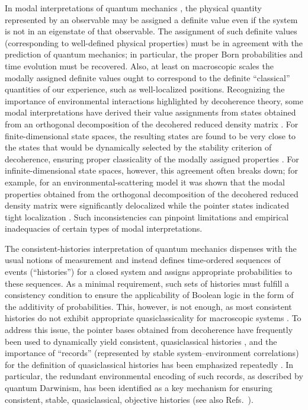 \documentclass[3p,sort&compress]{elsarticle}
\begin{document}
In modal interpretations of quantum mechanics \cite{Clifton:1996:op}, the physical quantity represented by an observable may be assigned a definite value even if the system is not in an eigenstate of that observable. The assignment of such definite values (corresponding to well-defined physical properties) must be in agreement with the prediction of quantum mechanics; in particular, the proper Born probabilities and time evolution must be recovered. Also, at least on macroscopic scales the modally assigned definite values ought to correspond to the definite ``classical'' quantities of our experience, such as well-localized positions. Recognizing the importance of environmental interactions  highlighted by decoherence theory, some modal interpretations have derived their value assignments from states obtained from an orthogonal decomposition of the decohered reduced density matrix \cite{Bacciagaluppi:1996:po,Bene:2001:po}. For finite-dimensional state spaces, the resulting states are found to be very close to the states that would be dynamically selected by the stability criterion of decoherence, ensuring proper classicality of the modally assigned properties \cite{Bacciagaluppi:1996:po,Bene:2001:po}. For infinite-dimensional state spaces, however, this agreement often breaks down; for example, for an environmental-scattering model it was shown that the modal properties obtained from the orthogonal decomposition of the decohered reduced density matrix were significantly delocalized while the pointer states indicated tight localization \cite{Bacciagaluppi:2000:yz}. Such inconsistencies can pinpoint limitations and empirical inadequacies of certain types of modal interpretations.

The consistent-histories interpretation of quantum mechanics \cite{Griffiths:1984:tr,Omnes:1994:pz,Griffiths:2002:tr} dispenses with the usual notions of measurement and instead defines time-ordered sequences of events (``histories'') for a closed system and assigns appropriate probabilities to these sequences. As a minimal requirement, such sets of histories must fulfill a consistency condition \cite{Griffiths:1984:tr,Omnes:1994:pz,Griffiths:2002:tr} to ensure the applicability of Boolean logic in the form of the additivity of probabilities. This, however, is not enough, as most consistent histories do not exhibit appropriate quasiclassicality for macroscopic systems \cite{GellMann:1990:uz,GellMann:1991:pp,Zurek:1993:pu,Paz:1993:ww,Albrecht:1993:pq,Dowker:1995:pa,Dowker:1996:ch}. To address this issue, the pointer bases obtained from decoherence have frequently been used to dynamically yield consistent, quasiclassical histories 
\cite{Zurek:1993:pu,Paz:1993:ww,Albrecht:1992:rz,Albrecht:1993:pq,Twamley:1993:bz}, and the importance of ``records'' (represented by stable
system--environment correlations) for the definition of quasiclassical histories  has been emphasized repeatedly \cite{Albrecht:1992:rz,Albrecht:1993:pq,Paz:1993:ww,Zurek:1993:pu,Zurek:2002:ii,GellMann:1998:xy}. In particular, the redundant environmental encoding of such records, as described by quantum Darwinism, has been identified as a key mechanism for ensuring consistent, stable, quasiclassical, objective histories \cite{Riedel:2016:oo} (see also Refs.~\cite{Zurek:1993:pu,Paz:1993:ww,Zurek:2002:ii,Zurek:2003:pl}).
\end{document}
